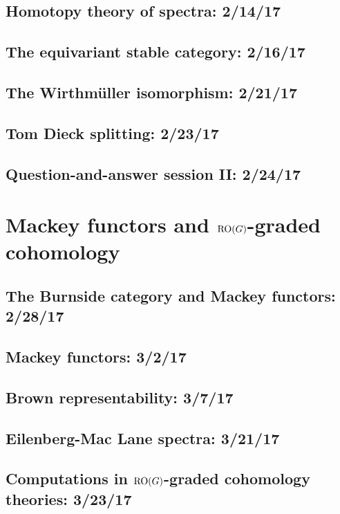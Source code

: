 \documentclass[openany]{style_EHT}
\begin{document}
\section{Homotopy theory of spectra: 2/14/17}
	
\section{The equivariant stable category: 2/16/17}
	
\section{The Wirthmüller isomorphism: 2/21/17}
	
\section{Tom Dieck splitting: 2/23/17}
	
\section{Question-and-answer session II: 2/24/17}
	

\chapter{Mackey functors and $\mathrm{RO}(G)$-graded cohomology}
\section{The Burnside category and Mackey functors: 2/28/17}
	
\section{Mackey functors: 3/2/17}
	
\section{Brown representability: 3/7/17}
	
\section{Eilenberg-Mac Lane spectra: 3/21/17}
	
\section{Computations in $\mathrm{RO}(G)$-graded cohomology theories: 3/23/17}
	
\end{document}
